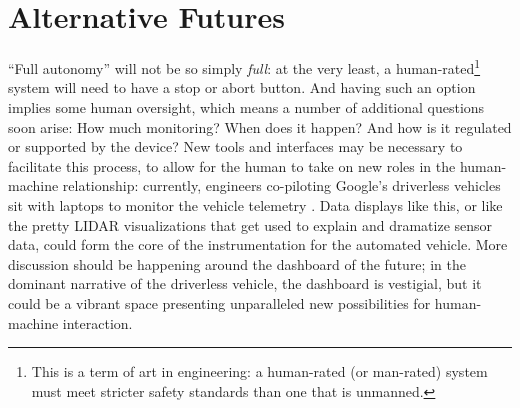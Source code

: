 \section{Alternative Futures}




``Full autonomy'' will not be so
simply \emph{full}: at the very least, a human-rated\footnote{This is
  a term of art in engineering: a human-rated (or man-rated) system
  must meet stricter safety standards than one that is unmanned.}
system will need to have 
a stop or abort button. And having such an option implies some human
oversight, which means a number of additional questions soon arise:
How much monitoring? When does it happen? And how is it
regulated or supported by the device? New tools and interfaces
may be necessary to facilitate this process, to allow for the human to
take on new roles in the human-machine relationship: currently, engineers
co-piloting Google's driverless vehicles sit with laptops to monitor
the vehicle telemetry \cite{bilgerAuto}. Data displays
like this, or like the pretty LIDAR visualizations that get used to
explain and dramatize sensor data, could  form the core of the
instrumentation for the automated vehicle. More discussion should be
happening around the dashboard of the future; in the dominant
narrative of the driverless vehicle, the dashboard is vestigial, but
it could be a vibrant space presenting unparalleled new possibilities
for human-machine interaction.

